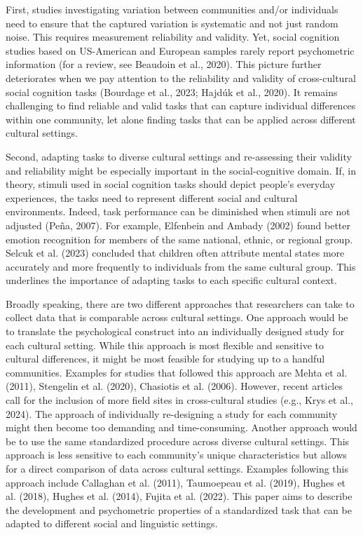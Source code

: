 \documentclass[
  man,mask,floatsintext]{apa7}
\begin{document}
First, studies investigating variation between communities and/or individuals need to ensure that the captured variation is systematic and not just random noise. This requires measurement reliability and validity. Yet, social cognition studies based on US-American and European samples rarely report psychometric information (for a review, see Beaudoin et al., 2020). This picture further deteriorates when we pay attention to the reliability and validity of cross-cultural social cognition tasks (Bourdage et al., 2023; Hajdúk et al., 2020). It remains challenging to find reliable and valid tasks that can capture individual differences within one community, let alone finding tasks that can be applied across different cultural settings.

Second, adapting tasks to diverse cultural settings and re-assessing their validity and reliability might be especially important in the social-cognitive domain. If, in theory, stimuli used in social cognition tasks should depict people's everyday experiences, the tasks need to represent different social and cultural environments. Indeed, task performance can be diminished when stimuli are not adjusted (Peña, 2007). For example, Elfenbein and Ambady (2002) found better emotion recognition for members of the same national, ethnic, or regional group. Selcuk et al. (2023) concluded that children often attribute mental states more accurately and more frequently to individuals from the same cultural group. This underlines the importance of adapting tasks to each specific cultural context.

Broadly speaking, there are two different approaches that researchers can take to collect data that is comparable across cultural settings. One approach would be to translate the psychological construct into an individually designed study for each cultural setting. While this approach is most flexible and sensitive to cultural differences, it might be most feasible for studying up to a handful communities. Examples for studies that followed this approach are Mehta et al. (2011), Stengelin et al. (2020), Chasiotis et al. (2006). However, recent articles call for the inclusion of more field sites in cross-cultural studies (e.g., Krys et al., 2024). The approach of individually re-designing a study for each community might then become too demanding and time-consuming. Another approach would be to use the same standardized procedure across diverse cultural settings. This approach is less sensitive to each community's unique characteristics but allows for a direct comparison of data across cultural settings. Examples following this approach include Callaghan et al. (2011), Taumoepeau et al. (2019), Hughes et al. (2018), Hughes et al. (2014), Fujita et al. (2022). This paper aims to describe the development and psychometric properties of a standardized task that can be adapted to different social and linguistic settings.
\end{document}
